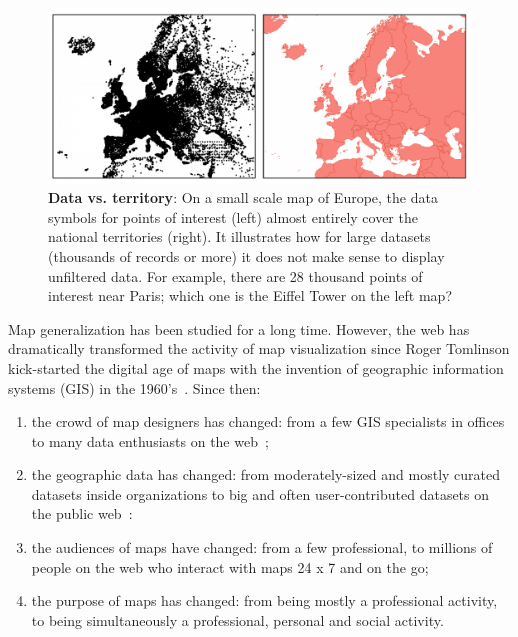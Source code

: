 \documentclass[11pt, oneside]{report}
\begin{document}
\begin{figure}[htbp]
\begin{center}
\includegraphics[scale=.495]{figs-thesis/data-draws-the-world.pdf}
\caption{\textbf{Data vs. territory}: On a small scale map of Europe, the data symbols for points of interest (left) almost entirely cover the national territories (right). It illustrates how for large datasets (thousands of records or more) it does not make sense to display unfiltered data. For example, there are 28 thousand points of interest near Paris; which one is the Eiffel Tower on the left map?}
\label{fig:raw:poi:data}
\end{center}
\vspace*{-4ex}
\end{figure}

Map generalization has been studied for a long time. However, the web has dramatically transformed the activity of map visualization since Roger Tomlinson kick-started the digital age of maps with the invention of geographic information systems (GIS) in the 1960's~\cite{ucgis2014tomlinson}. Since then:

\begin{enumerate}
\item the crowd of map designers has changed: from a few GIS specialists in offices to many data enthusiasts on the web~\cite{hanrahan2012enthusiast};
\item the geographic data has changed: from moderately-sized and mostly curated datasets inside organizations to big and often user-contributed datasets on the public web~\cite{gst2014digitalmapsupply, openstreetmap, zooniverse2014oldweather}:
\item the audiences of maps have changed: from a few professional, to millions of people on the web who interact with maps 24 x 7 and on the go;
\item the purpose of maps has changed: from being mostly a professional activity, to being simultaneously a professional, personal and social activity. 
\end{enumerate}
\end{document}
